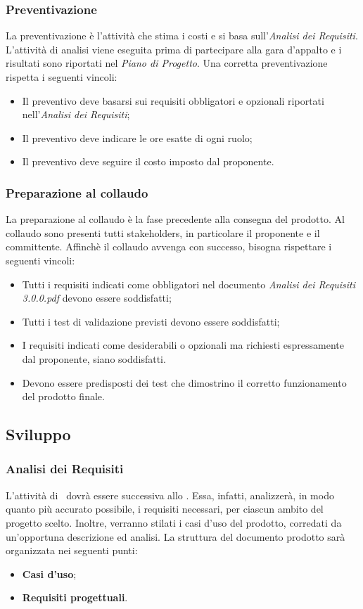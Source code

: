 		\subsubsection{Preventivazione}
		La preventivazione è l'attività che stima i costi e si basa sull'\textit{Analisi dei Requisiti}. L'attività di analisi viene eseguita prima di partecipare alla gara d'appalto e i risultati sono riportati nel \textit{Piano di Progetto}. Una corretta preventivazione rispetta i seguenti vincoli:
		\begin{itemize}
			\item Il preventivo deve basarsi sui requisiti obbligatori e opzionali riportati nell'\textit{Analisi dei Requisiti};
			\item Il preventivo deve indicare le ore esatte di ogni ruolo;
			\item  Il preventivo deve seguire il costo imposto dal proponente.
		\end{itemize}
	
		\subsubsection{Preparazione al collaudo}
		La preparazione al collaudo è la fase precedente alla consegna del prodotto. Al collaudo sono presenti tutti stakeholders, in particolare il proponente e il committente. Affinchè il collaudo avvenga con successo, bisogna rispettare i seguenti vincoli:
		\begin{itemize}
			\item Tutti i requisiti indicati come obbligatori nel documento  \textit{Analisi dei Requisiti 3.0.0.pdf} devono essere soddisfatti;
			\item Tutti i test di validazione previsti devono essere soddisfatti;
			\item I requisiti indicati come desiderabili o opzionali ma richiesti espressamente  dal proponente, siano soddisfatti.
			\item Devono essere predisposti dei test che dimostrino il corretto funzionamento del prodotto finale.
		\end{itemize}
		
		

	\subsection{Sviluppo}
	
		\subsubsection{Analisi dei Requisiti}
		L'attività di \AdR\ dovrà essere successiva allo \SdF. Essa, infatti, analizzerà, in modo quanto più accurato possibile, i requisiti necessari, per ciascun ambito del progetto scelto. Inoltre, verranno stilati i casi d'uso del prodotto, corredati da un'opportuna descrizione ed analisi. La struttura del documento prodotto sarà organizzata nei seguenti punti:
		\begin{itemize}
			\item \textbf{Casi d'uso};
			\item \textbf{Requisiti progettuali}.
		\end{itemize}
		
